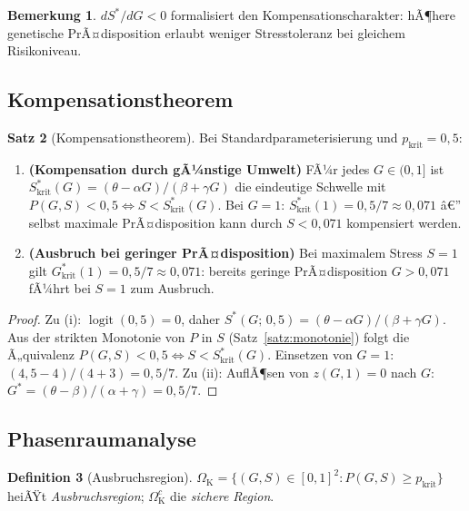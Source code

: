 ﻿\documentclass[12pt, a4paper]{article}
\theoremstyle{definition}
\newtheorem{definition}{Definition}[section]
\newtheorem{satz}[definition]{Satz}
\newtheorem{bemerkung}[definition]{Bemerkung}
\theoremstyle{remark}
\DeclareMathOperator{\logit}{logit}
\begin{document}
\begin{bemerkung}
$dS^*/dG < 0$ formalisiert den Kompensationscharakter: hÃ¶here genetische
PrÃ¤disposition erlaubt weniger Stresstoleranz bei gleichem Risikoniveau.
\end{bemerkung}

\subsection{Kompensationstheorem}

\begin{satz}[Kompensationstheorem]
\label{satz:kompensation}
Bei Standardparameterisierung und $p_{\mathrm{krit}} = 0{,}5$:
\begin{enumerate}[label=(\roman*)]
  \item \textbf{(Kompensation durch gÃ¼nstige Umwelt)}
    FÃ¼r jedes $G \in (0,1]$ ist
    $S^*_{\mathrm{krit}}(G) = (\theta - \alpha G)/(\beta + \gamma G)$
    die eindeutige Schwelle mit $P(G,S) < 0{,}5 \iff S < S^*_{\mathrm{krit}}(G)$.
    Bei $G=1$: $S^*_{\mathrm{krit}}(1) = 0{,}5/7 \approx 0{,}071$ â€”
    selbst maximale PrÃ¤disposition kann durch $S < 0{,}071$ kompensiert werden.
  \item \textbf{(Ausbruch bei geringer PrÃ¤disposition)}
    Bei maximalem Stress $S=1$ gilt $G^*_{\mathrm{krit}}(1) = 0{,}5/7 \approx 0{,}071$:
    bereits geringe PrÃ¤disposition $G > 0{,}071$ fÃ¼hrt bei $S=1$ zum Ausbruch.
\end{enumerate}
\end{satz}

\begin{proof}
Zu (i): $\logit(0{,}5) = 0$, daher $S^*(G;\,0{,}5) = (\theta - \alpha G)/(\beta + \gamma G)$.
Aus der strikten Monotonie von $P$ in $S$ (Satz~\ref{satz:monotonie}) folgt
die Ã„quivalenz $P(G,S) < 0{,}5 \iff S < S^*_{\mathrm{krit}}(G)$.
Einsetzen von $G=1$: $(4{,}5 - 4)/(4 + 3) = 0{,}5/7$.
Zu (ii): AuflÃ¶sen von $z(G,1) = 0$ nach $G$: $G^* = (\theta - \beta)/(\alpha + \gamma)
= 0{,}5/7$.
\end{proof}

\subsection{Phasenraumanalyse}

\begin{definition}[Ausbruchsregion]
\label{def:ausbruchsregion}
$\Omega_{\mathrm{K}} = \{(G,S) \in [0,1]^2 : P(G,S) \geq p_{\mathrm{krit}}\}$
heiÃŸt \emph{Ausbruchsregion}; $\Omega_{\mathrm{K}}^c$ die \emph{sichere Region}.
\end{definition}
\end{document}
